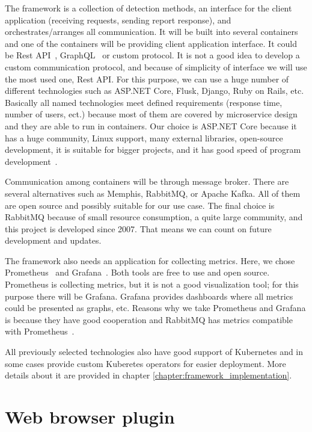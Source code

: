 The framework is a collection of detection methods, an interface for the client application (receiving requests, sending report response), and orchestrates/arranges all communication. It will be built into several containers and one of the containers will be providing client application interface. It could be Rest API~\cite{RestAPI}, GraphQL~\cite{GraphQL} or custom protocol. It is not a good idea to develop a custom communication protocol, and because of simplicity of interface we will use the most used one, Rest API. For this purpose, we can use a huge number of different technologies such as ASP.NET Core, Flusk, Django, Ruby on Rails, etc. Basically all named technologies meet defined requirements (response time, number of users, ect.) because most of them are covered by microservice design and they are able to run in containers. Our choice is ASP.NET Core because it has a huge community, Linux support, many external libraries, open-source development, it is suitable for bigger projects, and it has good speed of program development~\cite{ASPNETCore}.

Communication among containers will be through message broker. There are several alternatives such as Memphis, RabbitMQ, or Apache Kafka. All of them are open source and possibly suitable for our use case. The final choice is RabbitMQ because of small resource consumption, a quite large community, and this project is developed since 2007. That means we can count on future development and updates.~\cite{MessageBrokers}

The framework also needs an application for collecting metrics. Here, we chose Prome\-theus~\cite{Prometheus} and Grafana~\cite{Grafana}. Both tools are free to use and open source. Prometheus is collecting metrics, but it is not a good visualization tool; for this purpose there will be Grafana. Grafana provides dashboards where all metrics could be presented as graphs, etc. Reasons why we take Prometheus and Grafana is because they have good cooperation and RabbitMQ has metrics compatible with Prometheus~\cite{RabbitMQMonitoring}.

All previously selected technologies also have good support of Kubernetes and in some cases provide custom Kuberetes operators for easier deployment. More details about it are provided in chapter \ref{chapter:framework_implementation}.

\section{Web browser plugin}

